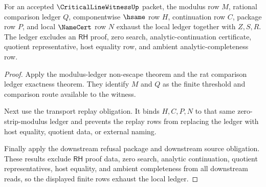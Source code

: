 \begin{theorem}
\label{thm:critical-line-witness-ledger-nonescape-obligation}
For an accepted $\CriticalLineWitnessUp$ packet, the modulus row $M$, rational comparison ledger $Q$, componentwise $\hsame$ row $H$, continuation row $C$, package row $P$, and local $\NameCert$ row $N$ exhaust the local ledger together with $Z,S,R$. The ledger excludes an $\mathsf{RH}$ proof, zero search, analytic-continuation certificate, quotient representative, host equality row, and ambient analytic-completeness row.
\end{theorem}
\begin{proof}
Apply the modulus-ledger non-escape theorem and the rat comparison ledger exactness theorem. They identify $M$ and $Q$ as the finite threshold and comparison route available to the witness.

Next use the transport replay obligation. It binds $H,C,P,N$ to that same zero-strip-modulus ledger and prevents the replay rows from replacing the ledger with host equality, quotient data, or external naming.

Finally apply the downstream refusal package and downstream source obligation. These results exclude $\mathsf{RH}$ proof data, zero search, analytic continuation, quotient representatives, host equality, and ambient completeness from all downstream reads, so the displayed finite rows exhaust the local ledger.
\end{proof}






